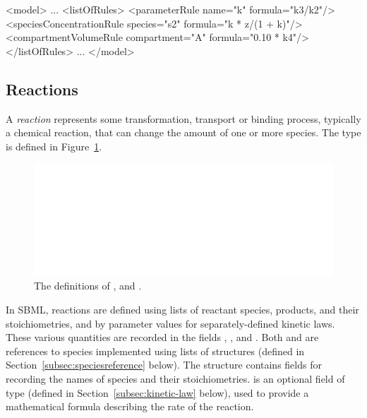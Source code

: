 \documentclass[10pt]{cekarticle}
\newcommand{\changed}[1]{\textcolor{BrickRed}{#1}}
\begin{document}
\begin{example}
<model>
    ...
    <listOfRules>
        <parameterRule name="k" formula="k3/k2"/>
        <speciesConcentrationRule species="s2" formula="k * z/(1 + k)"/>
        <compartmentVolumeRule compartment="A" formula="0.10 * k4"/>
    </listOfRules>
    ...
</model> 
\end{example}


\subsection{Reactions}
\label{sec:reactions}

A \emph{reaction} represents some transformation, transport or binding
process, typically a chemical reaction, that can change the amount of one
or more species.  The  type is defined in
Figure~\ref{fig:reaction}.  

\begin{figure}[htb]
  \centering
  \vspace*{8pt}
  \includegraphics[scale = 0.65]{reaction}
  \caption{The definitions of ,  and
    \changed{}.} 
  \label{fig:reaction}
\end{figure}

In SBML, reactions are defined using lists of reactant species, products,
and their stoichiometries, and by parameter values for separately-defined
kinetic laws.  These various quantities are recorded in the fields
, , and .  Both
 and  are references to species
implemented using lists of \changed{} structures
(defined in Section~\ref{subsec:speciesreference} below).  The
\changed{} structure contains fields for recording
the names of species and their stoichiometries.   is an
optional field of type  (defined in
Section~\ref{subsec:kinetic-law} below), used to provide a mathematical
formula describing the rate of the reaction.
\end{document}
